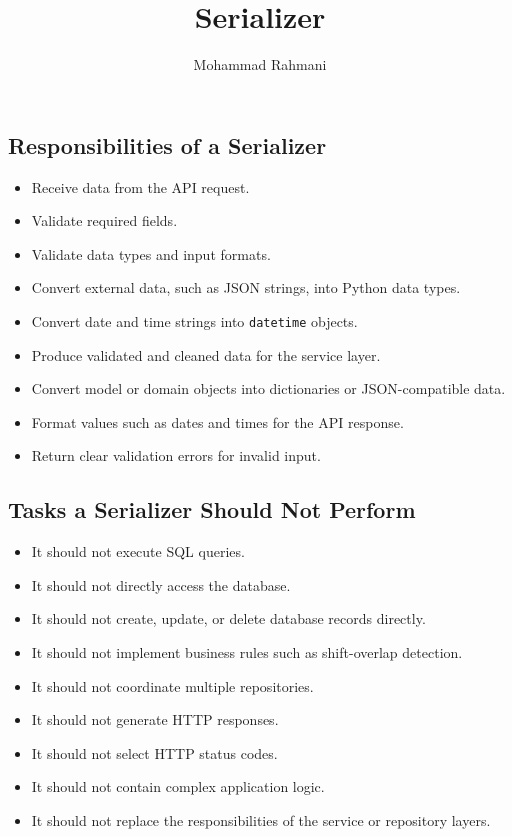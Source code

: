 \documentclass[a4paper]{article}
\title{Serializer}
\date{}
\author{Mohammad Rahmani}
\begin{document}
    \maketitle
    
    \subsection{Responsibilities of a Serializer}
        
        \begin{itemize}
            \item Receive data from the API request.
            \item Validate required fields.
            \item Validate data types and input formats.
            \item Convert external data, such as JSON strings, into Python data types.
            \item Convert date and time strings into \texttt{datetime} objects.
            \item Produce validated and cleaned data for the service layer.
            \item Convert model or domain objects into dictionaries or JSON-compatible data.
            \item Format values such as dates and times for the API response.
            \item Return clear validation errors for invalid input.
        \end{itemize}
    
    \subsection{Tasks a Serializer Should Not Perform}
        
        \begin{itemize}
            \item It should not execute SQL queries.
            \item It should not directly access the database.
            \item It should not create, update, or delete database records directly.
            \item It should not implement business rules such as shift-overlap detection.
            \item It should not coordinate multiple repositories.
            \item It should not generate HTTP responses.
            \item It should not select HTTP status codes.
            \item It should not contain complex application logic.
            \item It should not replace the responsibilities of the service or repository layers.
        \end{itemize}
        
        
\end{document}
